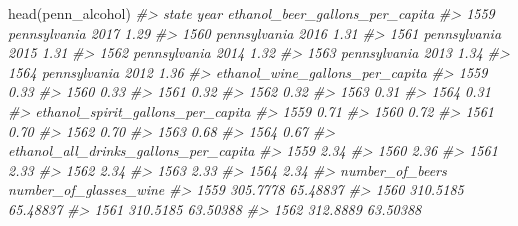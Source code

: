 \documentclass[
  12pt,
  openany]{book}
\newenvironment{Shaded}{\begin{snugshade}}{\end{snugshade}}
\newcommand{\CommentTok}[1]{\textcolor[rgb]{0.37,0.37,0.37}{\textit{#1}}}
\newcommand{\FunctionTok}[1]{\textcolor[rgb]{0,0,0}{#1}}
\newcommand{\NormalTok}[1]{#1}
\begin{document}
\begin{Shaded}
\begin{Highlighting}[]
\FunctionTok{head}\NormalTok{(penn\_alcohol)}
\CommentTok{\#\textgreater{}             state year ethanol\_beer\_gallons\_per\_capita}
\CommentTok{\#\textgreater{} 1559 pennsylvania 2017                            1.29}
\CommentTok{\#\textgreater{} 1560 pennsylvania 2016                            1.31}
\CommentTok{\#\textgreater{} 1561 pennsylvania 2015                            1.31}
\CommentTok{\#\textgreater{} 1562 pennsylvania 2014                            1.32}
\CommentTok{\#\textgreater{} 1563 pennsylvania 2013                            1.34}
\CommentTok{\#\textgreater{} 1564 pennsylvania 2012                            1.36}
\CommentTok{\#\textgreater{}      ethanol\_wine\_gallons\_per\_capita}
\CommentTok{\#\textgreater{} 1559                            0.33}
\CommentTok{\#\textgreater{} 1560                            0.33}
\CommentTok{\#\textgreater{} 1561                            0.32}
\CommentTok{\#\textgreater{} 1562                            0.32}
\CommentTok{\#\textgreater{} 1563                            0.31}
\CommentTok{\#\textgreater{} 1564                            0.31}
\CommentTok{\#\textgreater{}      ethanol\_spirit\_gallons\_per\_capita}
\CommentTok{\#\textgreater{} 1559                              0.71}
\CommentTok{\#\textgreater{} 1560                              0.72}
\CommentTok{\#\textgreater{} 1561                              0.70}
\CommentTok{\#\textgreater{} 1562                              0.70}
\CommentTok{\#\textgreater{} 1563                              0.68}
\CommentTok{\#\textgreater{} 1564                              0.67}
\CommentTok{\#\textgreater{}      ethanol\_all\_drinks\_gallons\_per\_capita}
\CommentTok{\#\textgreater{} 1559                                  2.34}
\CommentTok{\#\textgreater{} 1560                                  2.36}
\CommentTok{\#\textgreater{} 1561                                  2.33}
\CommentTok{\#\textgreater{} 1562                                  2.34}
\CommentTok{\#\textgreater{} 1563                                  2.33}
\CommentTok{\#\textgreater{} 1564                                  2.34}
\CommentTok{\#\textgreater{}      number\_of\_beers number\_of\_glasses\_wine}
\CommentTok{\#\textgreater{} 1559        305.7778               65.48837}
\CommentTok{\#\textgreater{} 1560        310.5185               65.48837}
\CommentTok{\#\textgreater{} 1561        310.5185               63.50388}
\CommentTok{\#\textgreater{} 1562        312.8889               63.50388}

\end{Highlighting}
\end{Shaded}
\end{document}
